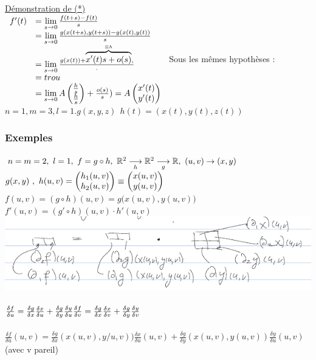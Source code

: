 \documentclass[12pt,a4paper]{article}
\begin{document}
\underline{Démonstration de (*)}\\
$\begin{array}{ll}
f'(t) 	& = \lim\limits_{s\to 0}\frac{f(t+s) - f(t)}{s}\\
		& = \lim\limits_{s\to 0}\frac{g(x(t+s), y(t+s)) - g(x(t), y(t))}{s}\\
		& = \lim\limits_{s\to 0}\frac{g(x(t)) + \overbrace{x'(t)s + o(s)}^{\equiv h},}{.} \\
		&= trou \\
		&= \lim\limits_{s\to 0}{A 
		\begin{pmatrix}
		\frac{h}{s}\\
		\frac{h}{s}
		\end{pmatrix} + \frac{o(s)}{s})} = A 
		\begin{pmatrix}
		x'(t)\\
		y'(t)
		\end{pmatrix}
\end{array}$
Sous les mêmes hypothèses : $n=1, m=3, l=1. g(x,y,z) \ \ h(t) = (x(t), y(t), z(t))$
\subsubsection{Exemples}
$n=m=2,\ l=1,\ f= g\circ h,\ \R^2 \underset{h}{\longrightarrow} \R^2 \underset{g}{\longrightarrow} \R,\ (u,v) \to (x,y)$\\
$g(x,y)\ , \ h(u,v) = \begin{pmatrix} h_1(u,v) \\ h_2(u,v) \end{pmatrix} \equiv \begin{pmatrix} x(u,v) \\ y(u,v) \end{pmatrix}$\\
$f(u,v) = (g\circ h)(u,v) = g\big(x(u,v),y(u,v)\big)$\\
$f'(u,v) = (g'\circ h)(u,v) \cdot h'(u,v)$\\
\includegraphics[scale=0.5]{images/compo2}\\
\\
$\frac{\delta f}{\delta u} = \frac{\delta g}{\delta x} \frac{\delta x}{\delta u} + \frac{\delta g}{\delta y}\frac{\delta y}{\delta u}\\
\frac{\delta f}{\delta v} = \frac{\delta g}{\delta x} \frac{\delta x}{\delta v} + \frac{\delta g}{\delta y}\frac{\delta y}{\delta v}$\\
\\
$\frac{\delta f}{\delta u}(u,v) = \frac{\delta g}{\delta x}(x(u,v),y/u,v)) \frac{\delta x}{\delta u}(u,v) + \frac{\delta g}{\delta y}(x(u,v),y(u,v)) \frac{\delta y}{\delta u}(u,v)$\\
(avec v pareil)
\end{document}

